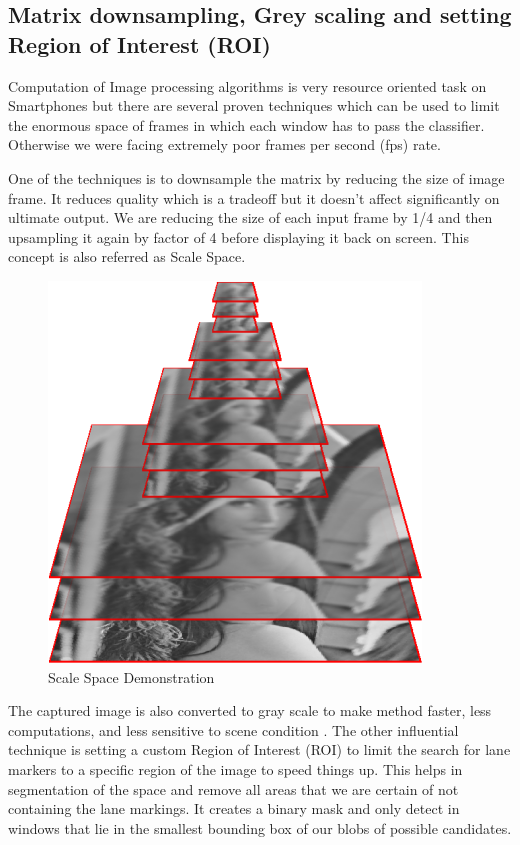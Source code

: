 \subsection{Matrix downsampling, Grey scaling and setting Region of Interest (ROI)}

Computation of Image processing algorithms is very resource oriented task on
Smartphones but there are several proven techniques which can be used to limit
the enormous space of frames in which each window has to pass the classifier. Otherwise we
were facing extremely poor frames per second (fps) rate. 

One of the techniques is to downsample the matrix by reducing the size of image
frame.  It reduces quality which is a tradeoff but it doesn't affect significantly on
ultimate output. We are reducing the size of each input frame by 1/4 and then upsampling it again by
factor of 4 before displaying it back on screen. This concept is also referred as Scale Space.

\begin{figure}
\begin{center}
    \includegraphics[scale=0.6]{img/lane2.png}
\end{center}
\caption{Scale Space Demonstration}
\label{fig:lane2}
\end{figure}

The captured image is also converted to gray scale to make method faster, less
computations, and less sensitive to scene condition \cite{lane2}. The other influential
technique is setting a custom Region of Interest (ROI) to limit the search for
lane markers to a specific region of the image to speed things up. This helps in
segmentation of the space and remove all areas that we are certain of not
containing the lane markings. It creates a binary mask and only detect in
windows that lie in the smallest bounding box of our blobs of possible
candidates.

